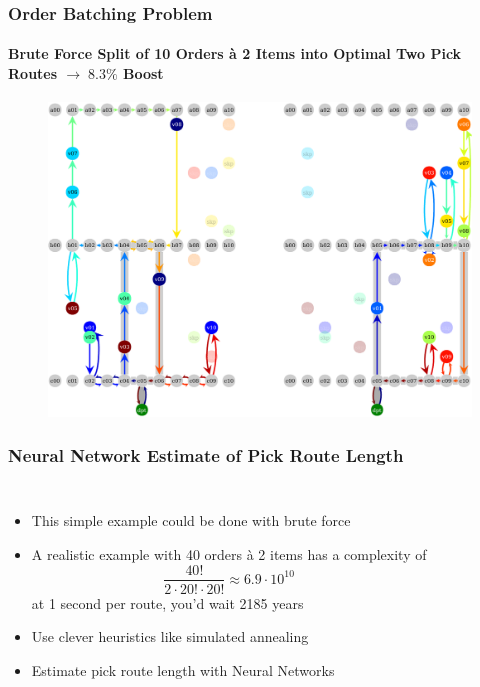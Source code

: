 \documentclass[english,a4,aspectratio=169]{beamer}
\begin{document}
\begin{frame}
\frametitle{Order Batching Problem}
\framesubtitle{Brute Force Split of 10 Orders \`a 2 Items into Optimal Two Pick Routes $\rightarrow\;8.3\%$ Boost}
 \begin{figure}
  \centering
  \includegraphics[width=.7\textwidth]{../figures/best.png}
 \end{figure}
\end{frame}

\begin{frame}
 \frametitle{Neural Network Estimate of Pick Route Length}
  \begin{columns}[c]
  \begin{itemize}
   \item This simple example could be done with brute force
   \item A realistic example with 40 orders \`a 2 items has a complexity of
   \[\frac{40!}{2\cdot 20!\cdot 20!}\approx6.9\cdot 10^{10}\]
   at 1 second per route, you'd wait 2185 years
   \item<2-> Use clever heuristics like simulated annealing
   \item<2-> Estimate pick route length with Neural Networks 
  \end{itemize}
  \end{columns}
\end{frame}
\end{document}
